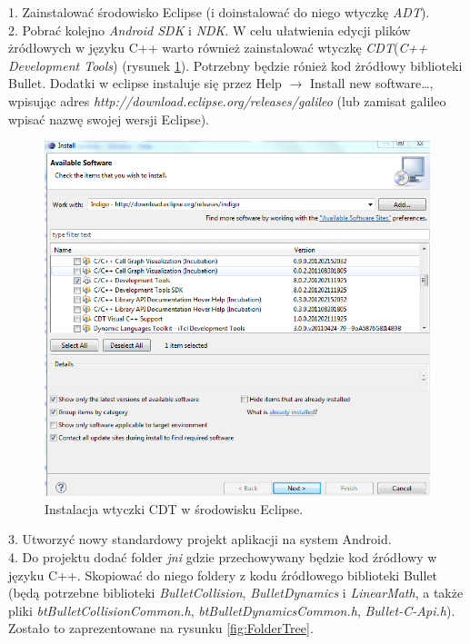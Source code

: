 1. Zainstalować środowisko Eclipse (i doinstalować do niego wtyczkę
\emph{ADT}).\\

2. Pobrać kolejno \emph{Android SDK} i \emph{NDK}. W celu ułatwienia edycji
plików żródłowych w języku C++ warto również zainstalować wtyczkę 
\emph{CDT}(\emph{C++ Development Tools}) (rysunek \ref{fig:CDTinstall}).
Potrzebny będzie rónież kod żródłowy biblioteki Bullet. Dodatki w eclipse
instaluje się przez Help $ \rightarrow $ Install new software\ldots , wpisując adres
\emph{http://download.eclipse.org/releases/galileo} (lub zamisat galileo wpisać
nazwę swojej wersji Eclipse).\\
\begin{figure}[h]
\centering
\includegraphics[width=\textwidth]{./img/CDT.png}
\caption{Instalacja wtyczki CDT w środowisku Eclipse.}
\label{fig:CDTinstall}
\end{figure}

3. Utworzyć nowy standardowy projekt aplikacji na system Android.\\

4. Do projektu dodać folder \emph{jni} gdzie przechowywany będzie kod źródłowy
w języku C++. Skopiować do niego foldery z kodu źródłowego biblioteki
Bullet (będą potrzebne biblioteki \emph{BulletCollision},
\emph{BulletDynamics} i \emph{LinearMath}, a także pliki \emph{btBulletCollisionCommon.h},
\emph{btBulletDynamicsCommon.h}, \emph{Bullet-C-Api.h}). Zostało to
zaprezentowane na rysunku \ref{fig:FolderTree}.\\

